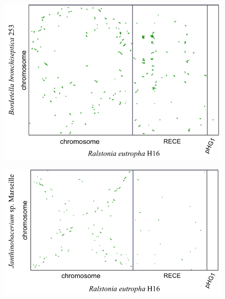 \begin{figure}[H]
\begin{center}
\hspace{-3cm}
	\begin{minipage}{0.5\textwidth}
		\includegraphics[width=\textwidth]{./img/synteny/new/fig8_11a.png}
		\label{figsyntrals1}
	\end{minipage}
	\begin{minipage}{0.5\textwidth}
	\hspace{1cm}
		\includegraphics[width=1.1\textwidth]{./img/synteny/new/fig8_11b.png}
		\label{figsyntrals2}
	\end{minipage}
	\\   
	\begin{minipage}{0.5\textwidth}

\end{minipage}
\end{center}
\end{figure}

